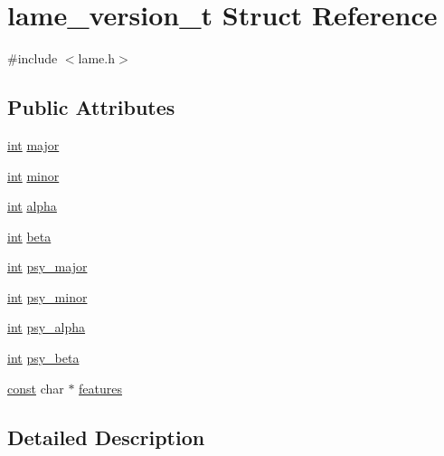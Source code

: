 \hypertarget{structlame__version__t}{}\section{lame\+\_\+version\+\_\+t Struct Reference}
\label{structlame__version__t}


{\ttfamily \#include $<$lame.\+h$>$}

\subsection*{Public Attributes}
\begin{DoxyCompactItemize}
\item 
\hyperlink{xmltok_8h_a5a0d4a5641ce434f1d23533f2b2e6653}{int} \hyperlink{structlame__version__t_aba32f4dbb0c119bfb2365c427f9fa554}{major}
\item 
\hyperlink{xmltok_8h_a5a0d4a5641ce434f1d23533f2b2e6653}{int} \hyperlink{structlame__version__t_aa73e24f5129aadebf0d902f634146b05}{minor}
\item 
\hyperlink{xmltok_8h_a5a0d4a5641ce434f1d23533f2b2e6653}{int} \hyperlink{structlame__version__t_a4e0d47265d25e4e09c25391846e92273}{alpha}
\item 
\hyperlink{xmltok_8h_a5a0d4a5641ce434f1d23533f2b2e6653}{int} \hyperlink{structlame__version__t_a92b4b9a68a98a38c547f93748493f11c}{beta}
\item 
\hyperlink{xmltok_8h_a5a0d4a5641ce434f1d23533f2b2e6653}{int} \hyperlink{structlame__version__t_ac532bb838b8dcde0e2c73369fec6bfe5}{psy\+\_\+major}
\item 
\hyperlink{xmltok_8h_a5a0d4a5641ce434f1d23533f2b2e6653}{int} \hyperlink{structlame__version__t_a68bfe550749346b807489ec25ca038b5}{psy\+\_\+minor}
\item 
\hyperlink{xmltok_8h_a5a0d4a5641ce434f1d23533f2b2e6653}{int} \hyperlink{structlame__version__t_af6f62b1cae5369cf2652d8f1533d69fe}{psy\+\_\+alpha}
\item 
\hyperlink{xmltok_8h_a5a0d4a5641ce434f1d23533f2b2e6653}{int} \hyperlink{structlame__version__t_a4fec123afe5a55ba90bae3e7b4fc0447}{psy\+\_\+beta}
\item 
\hyperlink{getopt1_8c_a2c212835823e3c54a8ab6d95c652660e}{const} char $\ast$ \hyperlink{structlame__version__t_acc3db38c169739ddb467c0388b7ff699}{features}
\end{DoxyCompactItemize}


\subsection{Detailed Description}


